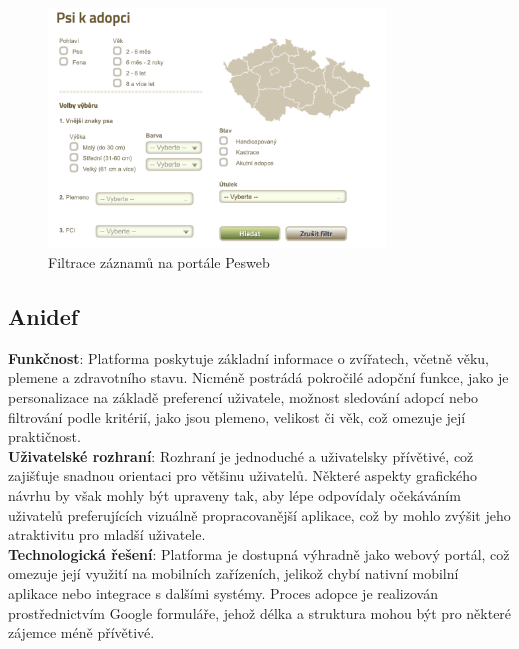 \documentclass[12pt,a4paper]{report}
\begin{document}
\begin{figure}[h!]
    \centering
    \includegraphics[width=0.8\textwidth]{img/pesweb.png} %
    \caption{Filtrace záznamů na portále Pesweb} %
    \label{fig:pesweb_filter} %
\end{figure}

\pagebreak

\subsection{Anidef}

\noindent \textbf{Funkčnost}: Platforma poskytuje základní informace o zvířatech, včetně věku, plemene a zdravotního stavu. Nicméně postrádá pokročilé adopční funkce, jako je personalizace na základě preferencí uživatele, možnost sledování adopcí nebo filtrování podle kritérií, jako jsou plemeno, velikost či věk, což omezuje její praktičnost.\\

\noindent\textbf{Uživatelské rozhraní}: Rozhraní je jednoduché a uživatelsky přívětivé, což zajišťuje snadnou orientaci pro většinu uživatelů. Některé aspekty grafického návrhu by však mohly být upraveny tak, aby lépe odpovídaly očekáváním uživatelů preferujících vizuálně propracovanější aplikace, což by mohlo zvýšit jeho atraktivitu pro mladší uživatele.\\

\noindent\textbf{Technologická řešení}: Platforma je dostupná výhradně jako webový portál, což omezuje její využití na mobilních zařízeních, jelikož chybí nativní mobilní aplikace nebo integrace s dalšími systémy. Proces adopce je realizován prostřednictvím Google formuláře, jehož délka a struktura mohou být pro některé zájemce méně přívětivé.\\
 
\end{document}

